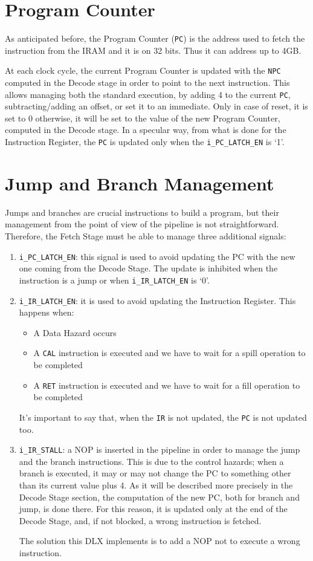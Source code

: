 \section{Program Counter}
As anticipated before, the Program Counter (\texttt{PC}) is the address used to fetch the instruction from the IRAM and it is on 32 bits. Thus it can address up to 4GB.

At each clock cycle, the current Program Counter is updated with the \texttt{NPC} computed in the Decode stage in order to point to the next instruction. This allows managing both the standard execution, by adding 4 to the current \texttt{PC}, subtracting/adding an offset, or set it to an immediate. Only in case of reset, it is set to 0 otherwise, it will be set to the value of the new Program Counter, computed in the Decode stage. In a specular way, from what is done for the Instruction Register, the \texttt{PC} is updated only when the \texttt{i\_PC\_LATCH\_EN} is `1'.

\section{Jump and Branch Management}
\label{sec:jmp_branch}
Jumps and branches are crucial instructions to build a program, but their management from the point of view of the pipeline is not straightforward. Therefore, the Fetch Stage must be able to manage three additional signals:
\begin{enumerate}
    \item \texttt{i\_PC\_LATCH\_EN}: this signal is used to avoid updating the PC with the new one coming from the Decode Stage. The update is inhibited when the instruction is a jump or when \texttt{i\_IR\_LATCH\_EN} is `0'. 
    \item \texttt{i\_IR\_LATCH\_EN}: it is used to avoid updating the Instruction Register. This happens when:
    \begin{itemize}
        \item A Data Hazard occurs
        \item A \texttt{CAL} instruction is executed and we have to wait for a spill operation to be completed
        \item A \texttt{RET} instruction is executed and we have to wait for a fill operation to be completed
    \end{itemize}
    It's important to say that, when the \texttt{IR} is not updated, the \texttt{PC} is not updated too.
    \item \texttt{i\_IR\_STALL}: a NOP is inserted in the pipeline in order to manage the jump and the branch instructions. This is due to the control hazards; when a branch is executed, it may or may not change the PC to something other than its current value plus 4. As it will be described more precisely in the Decode Stage section, the computation of the new PC, both for branch and jump, is done there. For this reason, it is updated only at the end of the Decode Stage, and, if not blocked, a wrong instruction is fetched.
    
    The solution this DLX implements is to add a NOP not to execute a wrong instruction.
\end{enumerate}